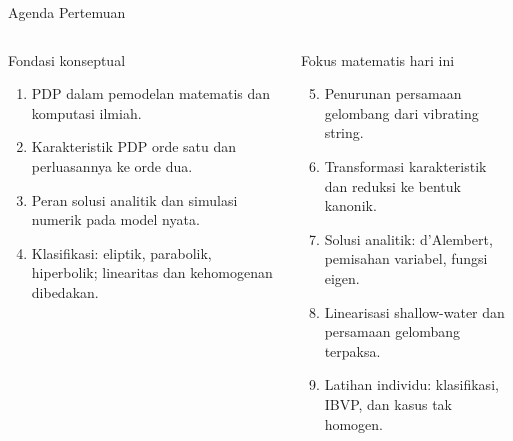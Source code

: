 \documentclass[aspectratio=169,10pt]{beamer}
\begin{document}
\begin{frame}{Agenda Pertemuan}
\begin{columns}[T,onlytextwidth]
\begin{block}{Fondasi konseptual}
\begin{enumerate}
  \item PDP dalam pemodelan matematis dan komputasi ilmiah.
  \item Karakteristik PDP orde satu dan perluasannya ke orde dua.
  \item Peran solusi analitik dan simulasi numerik pada model nyata.
  \item Klasifikasi: eliptik, parabolik, hiperbolik; linearitas dan kehomogenan dibedakan.
\end{enumerate}
\end{block}
\begin{block}{Fokus matematis hari ini}
\begin{enumerate}
  \setcounter{enumi}{4}
  \item Penurunan persamaan gelombang dari vibrating string.
  \item Transformasi karakteristik dan reduksi ke bentuk kanonik.
  \item Solusi analitik: d'Alembert, pemisahan variabel, fungsi eigen.
  \item Linearisasi shallow-water dan persamaan gelombang terpaksa.
  \item Latihan individu: klasifikasi, IBVP, dan kasus tak homogen.
\end{enumerate}
\end{block}
\end{columns}
\end{frame}
\end{document}
